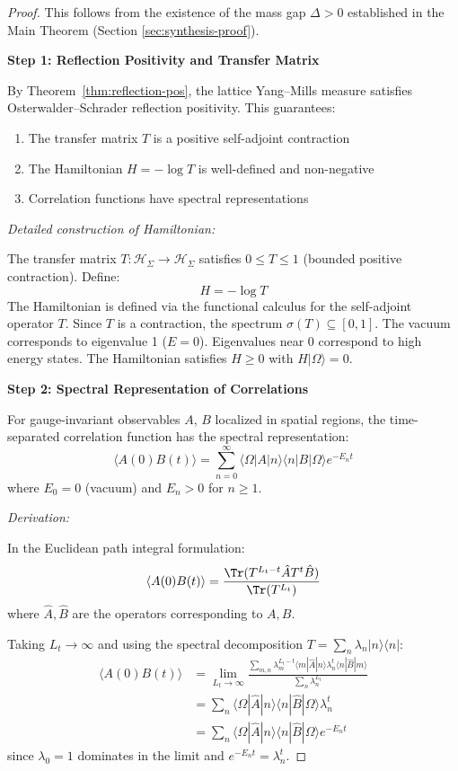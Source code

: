 \begin{proof}
This follows from the existence of the mass gap $\Delta > 0$ established in the Main Theorem (Section \ref{sec:synthesis-proof}).

\textbf{Step 1: Reflection Positivity and Transfer Matrix}

By Theorem~\ref{thm:reflection-pos}, the lattice Yang--Mills measure 
satisfies Osterwalder--Schrader reflection positivity. This guarantees:
\begin{enumerate}[label=(\alph*)]
\item The transfer matrix $T$ is a positive self-adjoint contraction
\item The Hamiltonian $H = -\log T$ is well-defined and non-negative
\item Correlation functions have spectral representations
\end{enumerate}

\textit{Detailed construction of Hamiltonian:}

The transfer matrix $T : \mathcal{H}_\Sigma \to \mathcal{H}_\Sigma$ satisfies 
$0 \leq T \leq 1$ (bounded positive contraction). Define:
\[
H = -\log T
\]
The Hamiltonian is defined via the functional calculus for the self-adjoint operator $T$. Since $T$ is a contraction, the spectrum $\sigma(T) \subseteq [0, 1]$. The vacuum corresponds to eigenvalue 1 ($E=0$). Eigenvalues near 0 correspond to high energy states.
The Hamiltonian satisfies $H \geq 0$ with $H|\Omega\rangle = 0$.

\textbf{Step 2: Spectral Representation of Correlations}

For gauge-invariant observables $A$, $B$ localized in spatial regions, the 
time-separated correlation function has the spectral representation:
\[
\langle A(0) B(t) \rangle = \sum_{n=0}^\infty \langle \Omega | A | n \rangle 
\langle n | B | \Omega \rangle e^{-E_n t}
\]
where $E_0 = 0$ (vacuum) and $E_n > 0$ for $n \geq 1$.

\textit{Derivation:}

In the Euclidean path integral formulation:
\[
\langle A(0) B(t) \rangle = \frac{\Tr(T^{L_t - t} \hat{A} T^t \hat{B})}{\Tr(T^{L_t})}
\]
where $\hat{A}, \hat{B}$ are the operators corresponding to $A, B$.

Taking $L_t \to \infty$ and using the spectral decomposition $T = \sum_n \lambda_n |n\rangle\langle n|$:
\begin{align*}
\langle A(0) B(t) \rangle &= \lim_{L_t \to \infty} 
\frac{\sum_{m,n} \lambda_m^{L_t - t} \langle m|\hat{A}|n\rangle \lambda_n^t \langle n|\hat{B}|m\rangle}{\sum_n \lambda_n^{L_t}} \\
&= \sum_n \langle \Omega|\hat{A}|n\rangle \langle n|\hat{B}|\Omega\rangle \lambda_n^t \\
&= \sum_n \langle \Omega|\hat{A}|n\rangle \langle n|\hat{B}|\Omega\rangle e^{-E_n t}
\end{align*}
since $\lambda_0 = 1$ dominates in the limit and $e^{-E_n t} = \lambda_n^t$.


\end{proof}
